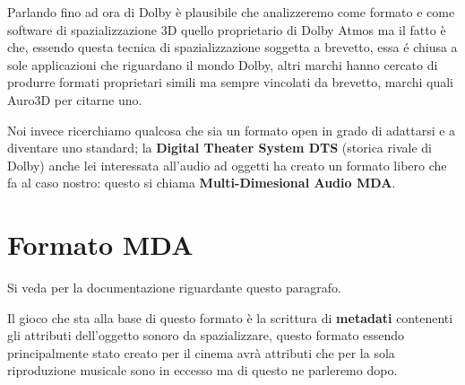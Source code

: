 \documentclass[12pt,a4paper]{report}
\begin{document}
Parlando fino ad ora di Dolby è plausibile che analizzeremo come formato e come software di spazializzazione 3D quello proprietario di Dolby Atmos ma il fatto è che, essendo questa tecnica di spazializzazione soggetta a brevetto, essa é chiusa a sole applicazioni che riguardano il mondo Dolby, altri marchi hanno cercato di produrre formati proprietari simili ma sempre vincolati da brevetto, marchi quali Auro3D per citarne uno.

Noi invece ricerchiamo qualcosa che sia un formato open in grado di adattarsi e a diventare uno standard; la \textbf{Digital Theater System DTS} (storica rivale di Dolby) anche lei interessata all'audio ad oggetti ha creato un formato libero che fa al caso nostro: questo si chiama \textbf{Multi-Dimesional Audio MDA}.







\section{Formato MDA}

Si veda \cite{mda} per la documentazione riguardante questo paragrafo.

Il gioco che sta alla base di questo formato è la scrittura di \textbf{metadati} contenenti gli attributi dell'oggetto sonoro da spazializzare, questo formato essendo principalmente stato creato per il cinema avrà attributi che per la sola riproduzione musicale sono in eccesso ma di questo ne parleremo dopo.
\end{document}
